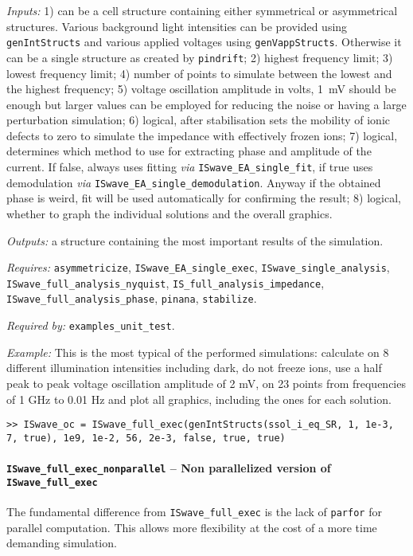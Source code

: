 	\textit{Inputs:} 1) can be a cell structure containing either symmetrical or asymmetrical structures. Various background
	light intensities can be provided using \texttt{gen\-Int\-Structs} and various applied voltages using \texttt{gen\-Vapp\-Structs}.
	Otherwise it can be a single structure as created by \texttt{pin\-drift};
	2) highest frequency limit;
	3) lowest frequency limit;
	4) number of points to simulate between the lowest and
	the highest frequency;
	5) voltage oscillation amplitude in volts, \SI{1}{\mV} should be enough but larger values can be employed for reducing the noise or having a large perturbation simulation;
	6) logical, after stabilisation sets the mobility of
	ionic defects to zero to simulate the impedance with effectively frozen ions;
	7) logical, determines which method to use for extracting phase and amplitude of the current.
	If false, always uses fitting \textsl{via} \texttt{IS\-wave\_EA\_single\_fit}, if true uses demodulation \textsl{via} \texttt{IS\-wave\_EA\_single\_demodulation}. Anyway if the obtained phase is weird, fit will be used
	automatically for confirming the result;
	8) logical, whether to graph the individual solutions and
	the overall graphics.

	\textit{Outputs:} a structure containing the most important results of the simulation.

	\textit{Requires:} \texttt{asymmetricize}, \texttt{IS\-wave\_EA\_single\_exec},
	\texttt{IS\-wave\_single\_analysis}, \texttt{IS\-wave\_full\_analysis\_nyquist},
	\texttt{IS\_full\_analysis\_impedance}, \texttt{IS\-wave\_full\_analysis\_phase}, \texttt{pinana},
	\texttt{stabilize}.

	\textit{Required by:} \texttt{examples\_unit\_test}.

	\textit{Example:} This is the most typical of the performed simulations: calculate on 8 different illumination intensities including dark, do not freeze ions, use a half peak to peak
	voltage oscillation amplitude of 2 mV, on 23 points from frequencies of 1 GHz to
	0.01 Hz and plot all graphics, including the ones for each solution.
	\begin{lstlisting}[style=Matlab-editor]
>> ISwave_oc = ISwave_full_exec(genIntStructs(ssol_i_eq_SR, 1, 1e-3, 7, true), 1e9, 1e-2, 56, 2e-3, false, true, true)
\end{lstlisting}

	\paragraph{\texttt{IS\-wave\_full\_exec\_nonparallel} -- Non parallelized version of \texttt{IS\-wave\_full\_exec}}
	The fundamental difference from \texttt{IS\-wave\_full\_exec} is the lack of \texttt{parfor}
	for parallel computation. This allows more flexibility at the cost of a
	more time demanding simulation.


